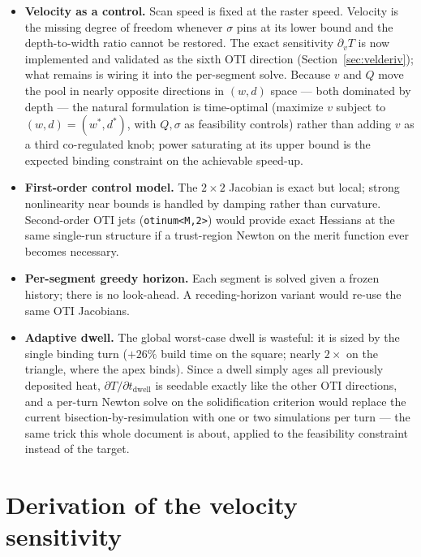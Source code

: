 \documentclass[11pt]{article}
\begin{document}
\begin{itemize}
  \item \textbf{Velocity as a control.} Scan speed is fixed at the raster
        speed. Velocity is the missing degree of freedom whenever $\sigma$
        pins at its lower bound and the depth-to-width ratio cannot be
        restored. The exact sensitivity $\partial_v T$ is now implemented and
        validated as the sixth OTI direction (Section~\ref{sec:velderiv});
        what remains is wiring it into the per-segment solve. Because $v$ and
        $Q$ move the pool in nearly opposite directions in $(w,d)$ space ---
        both dominated by depth --- the natural formulation is time-optimal
        (maximize $v$ subject to $(w,d)=(w^\ast,d^\ast)$, with $Q,\sigma$ as
        feasibility controls) rather than adding $v$ as a third co-regulated
        knob; power saturating at its upper bound is the expected binding
        constraint on the achievable speed-up.
  \item \textbf{First-order control model.} The $2\times2$ Jacobian is exact
        but local; strong nonlinearity near bounds is handled by damping
        rather than curvature. Second-order OTI jets
        (\texttt{otinum<M,2>}) would provide exact Hessians at the same
        single-run structure if a trust-region Newton on the merit function
        ever becomes necessary.
  \item \textbf{Per-segment greedy horizon.} Each segment is solved given a
        frozen history; there is no look-ahead. A receding-horizon variant
        would re-use the same OTI Jacobians.
  \item \textbf{Adaptive dwell.} The global worst-case dwell is wasteful:
        it is sized by the single binding turn ($+26\%$ build time on the
        square; nearly $2\times$ on the triangle, where the apex binds).
        Since a dwell simply ages all previously deposited heat,
        $\partial T/\partial t_{\mathrm{dwell}}$ is seedable exactly like
        the other OTI directions, and a per-turn Newton solve on the
        solidification criterion would replace the current
        bisection-by-resimulation with one or two simulations per turn ---
        the same trick this whole document is about, applied to the
        feasibility constraint instead of the target.
\end{itemize}

\appendix
\section{Derivation of the velocity sensitivity}
\label{app:vel}
\end{document}
